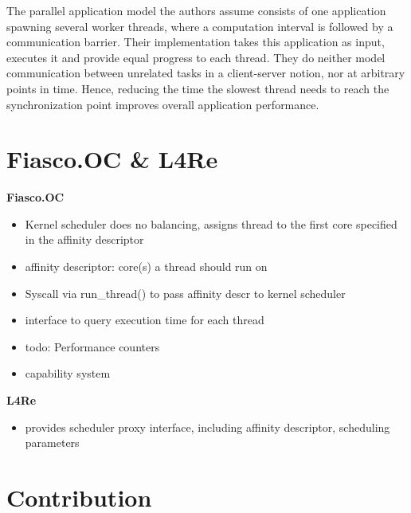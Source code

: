 The parallel application model the authors assume consists of one application
spawning several worker threads, where a computation interval is followed by a
communication barrier.
Their implementation takes this application as input, executes it and provide
equal progress to each thread.
They do neither model communication between unrelated tasks in a client-server
notion, nor at arbitrary points in time.
Hence, reducing the time the slowest thread needs to reach the synchronization
point improves overall application performance.




\section{Fiasco.OC \& L4Re}
\label{state:env}

\textbf{Fiasco.OC}
\begin{itemize}
  \item Kernel scheduler does no balancing, assigns thread to the first
    core specified in the affinity descriptor
  \item affinity descriptor: core(s) a thread should run on
  \item Syscall via run\_thread() to pass affinity descr to kernel scheduler
  \item interface to query execution time for each thread 
  \item	todo: Performance counters
  \item capability system
\end{itemize}

\textbf{L4Re}
\begin{itemize}
  \item provides scheduler proxy interface, including affinity descriptor,
    scheduling parameters
\end{itemize}



\section{Contribution}
\label{state:contr}


